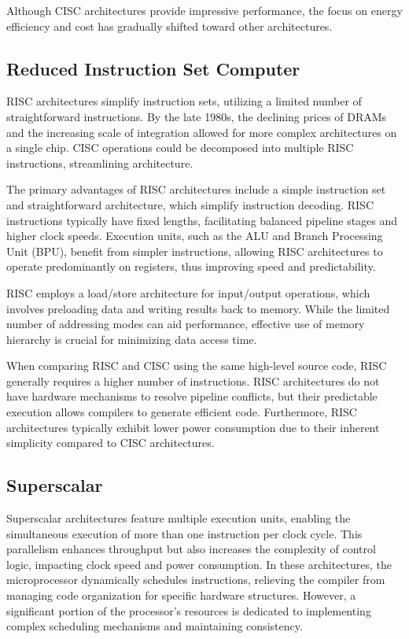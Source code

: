 Although CISC architectures provide impressive performance, the focus on energy efficiency and cost has gradually shifted toward other architectures.

\subsection{Reduced Instruction Set Computer}
RISC architectures simplify instruction sets, utilizing a limited number of straightforward instructions. 
By the late 1980s, the declining prices of DRAMs and the increasing scale of integration allowed for more complex architectures on a single chip. 
CISC operations could be decomposed into multiple RISC instructions, streamlining architecture.

The primary advantages of RISC architectures include a simple instruction set and straightforward architecture, which simplify instruction decoding. 
RISC instructions typically have fixed lengths, facilitating balanced pipeline stages and higher clock speeds. 
Execution units, such as the ALU and Branch Processing Unit (BPU), benefit from simpler instructions, allowing RISC architectures to operate predominantly on registers, thus improving speed and predictability.

RISC employs a load/store architecture for input/output operations, which involves preloading data and writing results back to memory. 
While the limited number of addressing modes can aid performance, effective use of memory hierarchy is crucial for minimizing data access time.

When comparing RISC and CISC using the same high-level source code, RISC generally requires a higher number of instructions. 
RISC architectures do not have hardware mechanisms to resolve pipeline conflicts, but their predictable execution allows compilers to generate efficient code. 
Furthermore, RISC architectures typically exhibit lower power consumption due to their inherent simplicity compared to CISC architectures.

\subsection{Superscalar}
Superscalar architectures feature multiple execution units, enabling the simultaneous execution of more than one instruction per clock cycle. 
This parallelism enhances throughput but also increases the complexity of control logic, impacting clock speed and power consumption. 
In these architectures, the microprocessor dynamically schedules instructions, relieving the compiler from managing code organization for specific hardware structures. 
However, a significant portion of the processor's resources is dedicated to implementing complex scheduling mechanisms and maintaining consistency.

